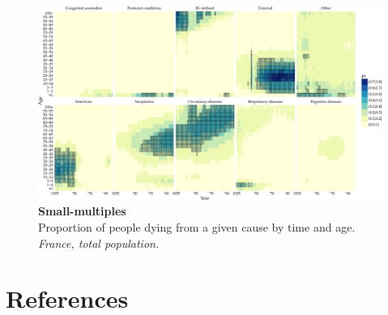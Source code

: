 \documentclass{beamer}
\begin{document}
\begin{frame}
\frametitle{\insertsection}

\begin{figure}[htb!]
\includegraphics[width = \textwidth]{../fig/plot-small_multiples.pdf}\\
\scriptsize \textbf{Small-multiples}\\ Proportion of people dying from a given cause by time and age. \tiny\emph{France, total population.}
\end{figure}

\end{frame}

\section{References} %

\begin{frame}
\frametitle{\insertsection}

\nocite{Schoeley2015}
\nocite{MOLAST2000}

\printbibliography

\end{frame}
\end{document}
